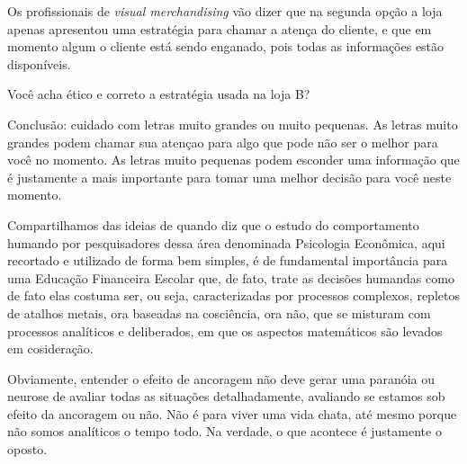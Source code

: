 Os profissionais de \textit{visual merchandising} vão dizer que na segunda opção a loja apenas apresentou uma estratégia para chamar a atença do cliente, e que em momento algum o cliente está sendo enganado, pois todas as informações estão disponíveis. 

\begin{reflection}
{Você acha ético e correto a estratégia usada na loja B}?
\end{reflection}

Conclusão: cuidado com letras muito grandes ou muito pequenas. As letras muito grandes podem chamar sua atençao para algo que pode não ser o melhor para você no momento. As letras muito pequenas podem esconder uma informação que é justamente a mais importante para tomar uma melhor decisão para você neste momento.

Compartilhamos das ideias de \cite{muniz2018} quando diz que o estudo do comportamento humando por pesquisadores dessa área denominada Psicologia Econômica, aqui recortado e utilizado de forma bem simples, é  de fundamental importância para uma Educação Financeira Escolar que, de fato, trate as decisões humandas como de fato elas costuma ser, ou seja, caracterizadas por processos complexos, repletos de atalhos metais, ora baseadas na cosciência, ora não, que se misturam com processos analíticos e deliberados, em que os aspectos matemáticos são levados em cosideração.

Obviamente, entender o efeito de ancoragem não deve gerar uma paranóia ou neurose de avaliar todas as situações detalhadamente, avaliando se estamos sob efeito da ancoragem ou não. Não é para viver uma vida chata, até mesmo porque não somos analíticos o tempo todo. Na verdade, o que acontece é justamente o oposto.

\clearpage

